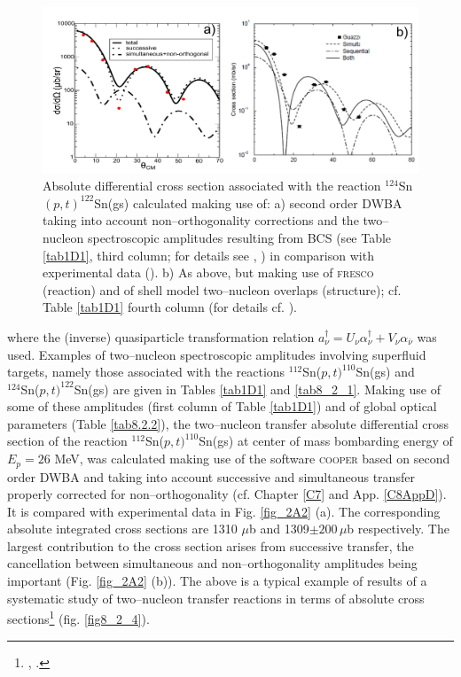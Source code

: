 \begin{figure}\label{fig2A3}
\centerline{\includegraphics*[width=\textwidth,angle=0]{nutshell/figs/fig2A3x.pdf}}
\caption{Absolute differential cross section associated with the reaction $^{124}$Sn$(p,t)^{122}$Sn(gs) calculated making use of: a) second order DWBA taking into account non--orthogonality corrections and the two--nucleon spectroscopic amplitudes resulting from BCS (see Table \ref{tab1D1}, third column; for details see \cite{Potel:13}, \cite{Potel:13b}) in comparison with experimental data (\cite{Guazzoni:11}). b) As above, but making use of \textsc{fresco} (reaction) and of shell model two--nucleon overlaps (structure); cf. Table \ref{tab1D1} fourth column (for details cf. \cite{Thompson:13}).}\label{fig_2A3}
\end{figure}
where the (inverse) quasiparticle transformation relation $a^{\dagger}_\nu=U_{\nu}\alpha^{\dagger}_{\nu}+V_{\nu}\alpha_{\bar{\nu}}$ was used. Examples of  two--nucleon spectroscopic amplitudes involving superfluid targets, namely those associated with the reactions $^{112}$Sn($p,t)^{110}$Sn(gs) and\\ $^{124}$Sn($p,t)^{122}$Sn(gs) are given in Tables \ref{tab1D1} and \ref{tab8_2_1}. Making use of some of these amplitudes (first column of Table \ref{tab1D1}) and of global optical parameters (Table \ref{tab8.2.2}), the two--nucleon transfer absolute differential cross section of the reaction $^{112}$Sn($p,t)^{110}$Sn(gs) at center of mass bombarding energy of $E_p=26$ MeV, was calculated making use of the software \textsc{cooper} based on second order DWBA and taking into account successive and simultaneous transfer properly corrected for non--orthogonality (cf. Chapter \ref{C7} and App. \ref{C8AppD}). It is compared with experimental data in Fig. \ref{fig_2A2} (a). The corresponding absolute integrated cross sections are 1310 $\mu$b and 1309$\pm 200 \,\mu$b respectively. The largest contribution to the cross section arises from successive transfer, the cancellation between simultaneous and non--orthogonality amplitudes being important (Fig. \ref{fig_2A2} (b)). The above is a typical example of results of a systematic study of two--nucleon transfer reactions in terms of absolute cross sections\footnote{\cite{Potel:13}, \cite{Potel:13b}.} (fig. \ref{fig8_2_4}).


